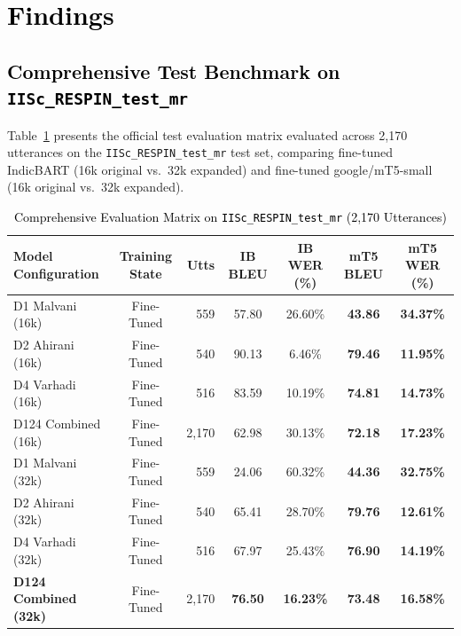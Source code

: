 \section{\textcolor{black}{Findings}}
\label{sec:findings}

\subsection{\textcolor{black}{Comprehensive Test Benchmark on \texttt{IISc\_RESPIN\_test\_mr}}}

Table~\ref{tab:respin_comprehensive} presents the official test evaluation matrix evaluated across 2,170 utterances on the \texttt{IISc\_RESPIN\_test\_mr} test set, comparing fine-tuned IndicBART (16k original vs.\ 32k expanded) and fine-tuned google/mT5-small (16k original vs.\ 32k expanded).

\begin{table}[t]
\color{black}
\centering
\caption{\textcolor{black}{Comprehensive Evaluation Matrix on \texttt{IISc\_RESPIN\_test\_mr} (2,170 Utterances)}}
\label{tab:respin_comprehensive}
\begin{tabularx}{\textwidth}{lcrcccc}
\hline
\textbf{Model Configuration} & \textbf{Training State} & \textbf{Utts} & \textbf{IB BLEU} & \textbf{IB WER (\%)} & \textbf{mT5 BLEU} & \textbf{mT5 WER (\%)} \\
\hline
D1 Malvani (16k) & Fine-Tuned & 559 & 57.80 & 26.60\% & \textbf{43.86} & \textbf{34.37\%} \\
D2 Ahirani (16k) & Fine-Tuned & 540 & 90.13 & 6.46\% & \textbf{79.46} & \textbf{11.95\%} \\
D4 Varhadi (16k) & Fine-Tuned & 516 & 83.59 & 10.19\% & \textbf{74.81} & \textbf{14.73\%} \\
D124 Combined (16k) & Fine-Tuned & 2,170 & 62.98 & 30.13\% & \textbf{72.18} & \textbf{17.23\%} \\
\hline
D1 Malvani (32k) & Fine-Tuned & 559 & 24.06 & 60.32\% & \textbf{44.36} & \textbf{32.75\%} \\
D2 Ahirani (32k) & Fine-Tuned & 540 & 65.41 & 28.70\% & \textbf{79.76} & \textbf{12.61\%} \\
D4 Varhadi (32k) & Fine-Tuned & 516 & 67.97 & 25.43\% & \textbf{76.90} & \textbf{14.19\%} \\
\textbf{D124 Combined (32k)} & Fine-Tuned & 2,170 & \textbf{76.50} & \textbf{16.23\%} & \textbf{73.48} & \textbf{16.58\%} \\
\hline
\end{tabularx}
\end{table}

